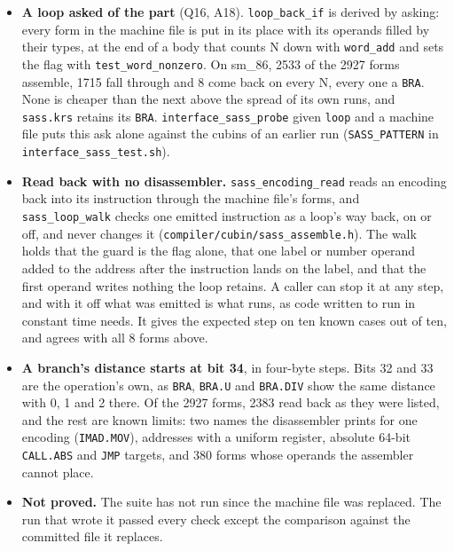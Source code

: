 \begin{enumerate}
\begin{itemize}
\item \textbf{A loop asked of the part} (Q16, A18). \texttt{loop\_\allowbreak{}back\_\allowbreak{}if} is derived by asking: every form in the machine file is put in its place with its operands filled by their types, at the end of a body that counts N down with \texttt{word\_\allowbreak{}add} and sets the flag with \texttt{test\_\allowbreak{}word\_\allowbreak{}nonzero}. On sm\_\allowbreak{}86, 2533 of the 2927 forms assemble, 1715 fall through and 8 come back on every N, every one a \texttt{BRA}. None is cheaper than the next above the spread of its own runs, and \texttt{sass.\allowbreak{}krs} retains its \texttt{BRA}. \texttt{interface\_\allowbreak{}sass\_\allowbreak{}probe} given \texttt{loop} and a machine file puts this ask alone against the cubins of an earlier run (\texttt{SASS\_\allowbreak{}PATTERN} in \texttt{interface\_\allowbreak{}sass\_\allowbreak{}test.\allowbreak{}sh}).
\item \textbf{Read back with no disassembler.} \texttt{sass\_\allowbreak{}encoding\_\allowbreak{}read} reads an encoding back into its instruction through the machine file's forms, and \texttt{sass\_\allowbreak{}loop\_\allowbreak{}walk} checks one emitted instruction as a loop's way back, on or off, and never changes it (\texttt{compiler/\allowbreak{}cubin/\allowbreak{}sass\_\allowbreak{}assemble.\allowbreak{}h}). The walk holds that the guard is the flag alone, that one label or number operand added to the address after the instruction lands on the label, and that the first operand writes nothing the loop retains. A caller can stop it at any step, and with it off what was emitted is what runs, as code written to run in constant time needs. It gives the expected step on ten known cases out of ten, and agrees with all 8 forms above.
\item \textbf{A branch's distance starts at bit 34}, in four-byte steps. Bits 32 and 33 are the operation's own, as \texttt{BRA}, \texttt{BRA.\allowbreak{}U} and \texttt{BRA.\allowbreak{}DIV} show the same distance with 0, 1 and 2 there. Of the 2927 forms, 2383 read back as they were listed, and the rest are known limits: two names the disassembler prints for one encoding (\texttt{IMAD.\allowbreak{}MOV}), addresses with a uniform register, absolute 64-bit \texttt{CALL.\allowbreak{}ABS} and \texttt{JMP} targets, and 380 forms whose operands the assembler cannot place.
\item \textbf{Not proved.} The suite has not run since the machine file was replaced. The run that wrote it passed every check except the comparison against the committed file it replaces.
\end{itemize}
\end{enumerate}
